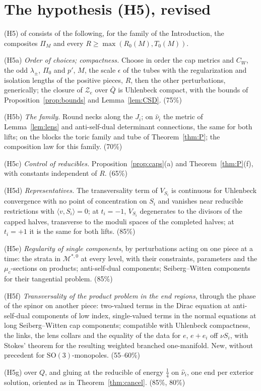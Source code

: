 \documentclass[10pt]{amsart}
\numberwithin{equation}{section}
\theoremstyle{compact}
\newcommand{\SO}{\mathrm{SO}}
\newcommand{\cM}{\mathcal M}
\newcommand{\cZ}{\mathcal Z}
\newcommand{\Ms}{\cM^{*,0}}
\newcommand{\hyp}[1]{\par\noindent\textup{#1}\enspace}
\begin{document}
\section{The hypothesis (H5), revised}

(H5) of \cite{FS} consists of the following, for the family of the
Introduction, the composites $\Pi_M$ and every $R\ge\max(R_0(M),T_0(M))$.
\hyp{(H5a)} \emph{Order of choices; compactness.} Choose in order the cap
metrics and $C_W$, the odd $\lambda_\pm$, $\Pi_0$ and $p'$, $M$, the scale
$\epsilon$ of the tubes with the regularization and isolation lengths of the
positive pieces, $R$, then the other perturbations, generically; the closure of
$\cZ_e$ over $\bar Q$ is Uhlenbeck compact, with the bounds of
Proposition~\ref{prop:bounds} and Lemma~\ref{lem:CSD}. (75\%)
\hyp{(H5b)} \emph{The family.} Round necks along the $J_i$; on $\hat\nu_i$ the
metric of Lemma~\ref{lem:lens} and anti-self-dual determinant connections, the
same for both lifts; on the blocks the toric family and tube of
Theorem~\ref{thm:P}; the composition law \cite[Thm.~3.1]{FS} for this family.
(70\%)
\hyp{(H5c)} \emph{Control of reducibles.} Proposition~\ref{prop:caps}(a) and
Theorem~\ref{thm:P}(f), with constants independent of $R$. (65\%)
\hyp{(H5d)} \emph{Representatives.} The transversality term of $V_{S_i}$ is
continuous for Uhlenbeck convergence with no point of concentration on $S_i$
and vanishes near reducible restrictions with $\langle v,S_i\rangle=0$; at
$t_i=-1$, $V_{S_i}$ degenerates to the divisors of the capped halves,
transverse to the moduli spaces of the completed halves; at $t_i=+1$ it is the
same for both lifts. (85\%)
\hyp{(H5e)} \emph{Regularity of single components}, by perturbations acting on
one piece at a time: the strata in $\Ms$ at every level, with their
constraints, parameters and the $\mu_c$-sections on products; anti-self-dual
components; Seiberg--Witten components for their tangential problem. (85\%)
\hyp{(H5f)} \emph{Transversality of the product problem in the end regions},
through the phase of the spinor on another piece: two-valued terms in the Dirac
equation at anti-self-dual components of low index, single-valued terms in the
normal equations at long Seiberg--Witten cap components; compatible with
Uhlenbeck compactness, the links, the lens collars and the equality of the data
for $e$, $e+e_i$ off $\nu S_i$, with Stokes' theorem for the resulting weighted
branched one-manifold. New, without precedent for $\SO(3)$-monopoles.
(55--60\%)
\hyp{(H5g)} \cite[Prop.~3.29]{FL2b} over $Q$, and gluing at the reducible of
energy $\frac14$ on $\hat\nu_i$, one end per exterior solution, oriented as in
Theorem~\ref{thm:cancel}. (85\%, 80\%)
\end{document}
